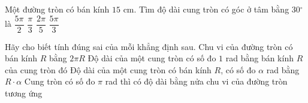 \begin{ex}%
	Một đường tròn có bán kính $15$ cm. Tìm độ dài cung tròn có  góc ở tâm bằng $30{^\circ}$ là
	 \choice
		 {\True $\dfrac{5\pi}{2}$}
		 {$\dfrac{\pi}{3}$}
		{$\dfrac{2\pi}{5}$} 
		 {$\dfrac{5\pi}{3}$}
\end{ex}



\begin{ex}%
 Hãy cho biết tính đúng sai của  mỗi khẳng định sau.
 \choiceTF 
  {\True Chu  vi của đường tròn có bán kính $R$ bằng $2\pi R$}
  {\True Độ dài của một cung tròn có số đo $1$ rad bằng bán kính $R$  của cung tròn đó}
  {\True Độ dài của một cung tròn có bán  kính $R$, có số đo $\alpha$ rad bằng $R\cdot \alpha$}
  {\True  Cung tròn có số đo $\pi$ rad thì có độ dài bằng nửa chu vi của đường tròn tương ứng}
\end{ex}


